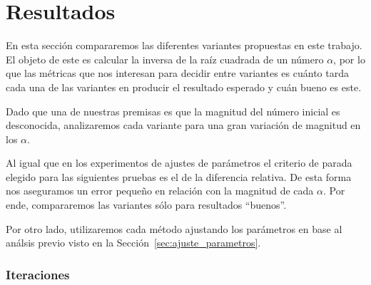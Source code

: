 \section{Resultados}


En esta sección compararemos las diferentes variantes propuestas en este
trabajo. El objeto de este es calcular la inversa de la raíz cuadrada de un
número $\alpha$, por lo que las métricas que nos interesan para decidir entre
variantes es cuánto tarda cada una de las variantes en producir el resultado
esperado y cuán bueno es este.

Dado que una de nuestras premisas es que la magnitud del número inicial es
desconocida, analizaremos cada variante para una gran variación de magnitud en
los $\alpha$.

Al igual que en los experimentos de ajustes de parámetros el criterio de parada
elegido para las siguientes pruebas es el de la diferencia relativa. De esta
forma nos aseguramos un error pequeño en relación con la magnitud de cada
$\alpha$. Por ende, compararemos las variantes sólo para resultados ``buenos''.

Por otro lado, utilizaremos cada método ajustando los parámetros en base al
análsis previo visto en la Sección~\ref{sec:ajuste_parametros}.

\subsubsection{Iteraciones}

